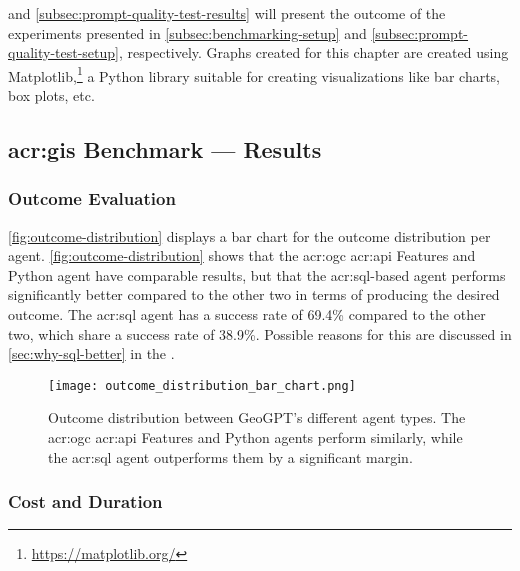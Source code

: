  and \autoref{subsec:prompt-quality-test-results} will present the outcome of the experiments presented in \autoref{subsec:benchmarking-setup} and \autoref{subsec:prompt-quality-test-setup}, respectively. Graphs created for this chapter are created using Matplotlib,\footnote{\url{https://matplotlib.org/}} a Python library suitable for creating visualizations like bar charts, box plots, etc.


\subsection[GIS Benchmark Experiment --- Results]{\acrshort{acr:gis} Benchmark --- Results}
\label{subsec:quantitative-results}

\subsubsection{Outcome Evaluation}

\autoref{fig:outcome-distribution} displays a bar chart for the outcome distribution per agent. \autoref{fig:outcome-distribution} shows that the \acrshort{acr:ogc} \acrshort{acr:api} Features and Python agent have comparable results, but that the \acrshort{acr:sql}-based agent performs significantly better compared to the other two in terms of producing the desired outcome. The \acrshort{acr:sql} agent has a success rate of 69.4\% compared to the other two, which share a success rate of 38.9\%. Possible reasons for this are discussed in \autoref{sec:why-sql-better} in the .

\begin{figure}[htbp]
    \centering
    \texttt{[image: outcome\_distribution\_bar\_chart.png]}
    \caption[Outcome distribution between GeoGPT's different agent types]{Outcome distribution between GeoGPT's different agent types. The \acrshort{acr:ogc} \acrshort{acr:api} Features and Python agents perform similarly, while the \acrshort{acr:sql} agent outperforms them by a significant margin.}
    \label{fig:outcome-distribution}
\end{figure}

\subsubsection{Cost and Duration}

